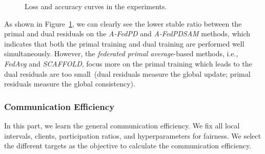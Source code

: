 \begin{figure}[h]
\vskip -0.05in
\centering
\vskip -0.1in
\caption{Loss and accuracy curves in the experiments.}
\label{residuals}
\vskip -0.1in
\end{figure}

As shown in Figure~\ref{residuals}, we can clearly see the lower stable ratio between the primal and dual residuals on the \textit{A-FedPD} and \textit{A-FedPDSAM} methods, which indicates that both the primal training and dual training are performed well simultaneously. However, the \textit{federated primal average}-based methods, i.e., \textit{FedAvg} and \textit{SCAFFOLD}, focus more on the primal training which leads to the dual residuals are too small~(dual residuals measure the global update; primal residuals measure the global consistency).


\newpage
\subsubsection{Communication Efficiency}
In this part, we learn the general communication efficiency. We fix all local intervals, clients, participation ratios, and hyperparameters for fairness. We select the different targets as the objective to calculate the communication efficiency.

